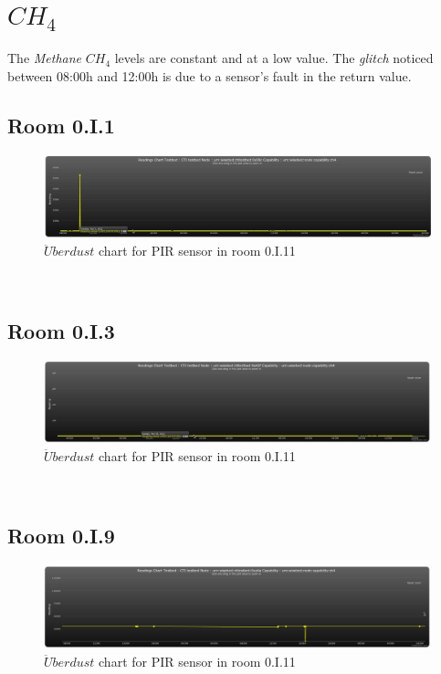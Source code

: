 \documentclass[12pt,a4paper,draft]{report}
\begin{document}
\section{$CH_4$}
%
The \textit{Methane} $CH_4$ levels are constant and at a low value.
The \textit{glitch} noticed between 08:00h and 12:00h is due to a sensor's fault in the return value.
\subsection{Room 0.I.1}
%
\begin{figure}[H]
\centering
	\includegraphics*[scale=0.3]{ch4_1}
	\caption{$\ddot{U}berdust$ chart for PIR sensor in room 0.I.11}
	\label{chart_ch4_1}
\end{figure}
\ \\
%
\subsection{Room 0.I.3}
%
\begin{figure}[H]
\centering
	\includegraphics*[scale=0.3]{ch4_3}
	\caption{$\ddot{U}berdust$ chart for PIR sensor in room 0.I.11}
	\label{chart_ch4_3}
\end{figure}
\ \\
%
\subsection{Room 0.I.9}
%
\begin{figure}[H]
\centering
	\includegraphics*[scale=0.3]{ch4_9}
	\caption{$\ddot{U}berdust$ chart for PIR sensor in room 0.I.11}
	\label{chart_ch4_9}
\end{figure}
\ \\
%
\end{document}
